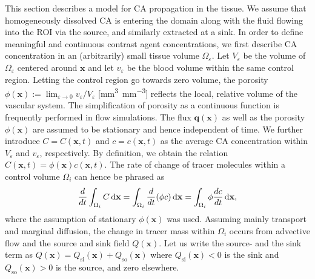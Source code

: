 \documentclass[final,5p,times,twocolumn]{elsarticle}
\begin{document}
	This section describes a model for  CA propagation in the tissue. %
	We assume that homogeneously dissolved CA is entering the domain along with the fluid flowing into the ROI via the source, and similarly extracted at a sink.
	In order to define meaningful and continuous contrast agent concentrations, we first describe CA concentration in an (arbitrarily) small tissue volume $\Omega_\varepsilon$.
	Let $V_\varepsilon$ be the volume of $\Omega_\varepsilon$ centered around $\mathbf{x}$ and let $v_\varepsilon$ be the blood volume within the same control region.
	Letting the control region go towards zero volume, the porosity $\phi(\mathbf{x}) :=  \lim_{\varepsilon \to 0} v_\varepsilon/V_\varepsilon$ [\si{\milli\meter\cubed\per\milli\meter\cubed}] reflects the local, relative volume of the vascular system. The simplification of porosity as a continuous function is frequently performed in flow simulations.
	The flux $\mathbf{q}(\mathbf{x})$ as well as the porosity $\phi(\mathbf{x})$ are assumed to be stationary and hence independent of time.	
	We further introduce $C = C(\mathbf{x},t)$ and $c = c(\mathbf{x},t)$ as the average CA concentration within $V_\varepsilon$ and $v_\varepsilon$, respectively.
	By definition, we obtain the relation $C(\mathbf{x},t) = \phi(\mathbf{x})  c(\mathbf{x},t)$.
	The rate of change of tracer molecules within a control volume $\Omega_i$ can hence be phrased as
	\begin{equation}
		\frac{d}{dt} \int_{\Omega_i}C  \,\mathrm{d} \mathbf{x} = \int_{\Omega_i}	\frac{d}{dt} (\phi c) \,\mathrm{d} \mathbf{x} = \int_{\Omega_i} \phi \frac{d c}{dt} \,\mathrm{d} \mathbf{x},
		\label{eq:dmdt}
	\end{equation}	
	where the assumption of stationary $\phi(\mathbf{x})$ was used.
	Assuming mainly transport and marginal diffusion, the change in tracer mass within $\Omega_i$ occurs from advective flow and the source and sink field $Q(\mathbf{x})$.
	Let us write the source- and the sink term as $Q(\mathbf{x}) = Q_{\mathrm{si}}(\mathbf{x}) + Q_{\mathrm{so}}(\mathbf{x})$ where $Q_{\mathrm{si}}(\mathbf{x}) < 0$ is the sink and $Q_{\mathrm{so}}(\mathbf{x}) > 0$ is the source, and zero elsewhere. 
\end{document}
